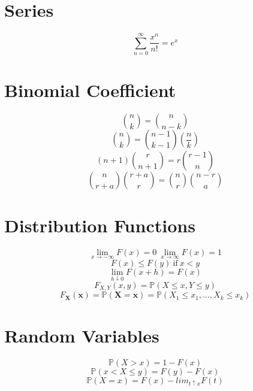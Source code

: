 \documentclass[twocolumn]{amsart}
\renewcommand{\P}{\mathbb{P}}
\begin{document}
\section*{Series}
\begin{equation*}
  \sum_{n=0}^{\infty}\frac{x^{n}}{n!} = e^{x}
\end{equation*}

\section*{Binomial Coefficient}
\begin{equation*}
  \binom{n}{k} = \binom{n}{n-k}
\end{equation*}
\begin{equation*}
  \binom{n}{k} = \binom{n-1}{k-1} \left( \frac{n}{k} \right)
\end{equation*}
\begin{equation*}
  (n+1)\binom{r}{n+1} = r\binom{r-1}{n}
\end{equation*}
\begin{equation*}
  \binom{n}{r+a}\binom{r+a}{r} = \binom{n}{r}\binom{n-r}{a}
\end{equation*}

\section*{Distribution Functions}
\begin{equation*}
  \lim_{x\to-\infty}F(x)=0~\lim_{x\to\infty}F(x)=1
\end{equation*}
\begin{equation*}
  F(x) \leq F(y)~\text{if}~x<y
\end{equation*}
\begin{equation*}
  \lim_{h \downarrow 0}F(x+h)=F(x)
\end{equation*}
\begin{equation*}
  F_{X,Y}(x,y)=\P(X\leq x,Y\leq y)
\end{equation*}
\begin{equation*}
  F_{\boldsymbol{X}}(\boldsymbol{x})=\P(\boldsymbol{X}=\boldsymbol{x}) =
  \P(X_{1}\leq x_{1},\ldots,X_{k}\leq x_{k})
\end{equation*}
\begin{equation*}
\end{equation*}

\section*{Random Variables}
\begin{equation*}
  \P(X>x) = 1-F(x)
\end{equation*}
\begin{equation*}
  \P(x<X\leq y) = F(y) - F(x)
\end{equation*}
\begin{equation*}
  \P(X=x)=F(x)-lim_{t\uparrow x}F(t)
\end{equation*}
\end{document}
